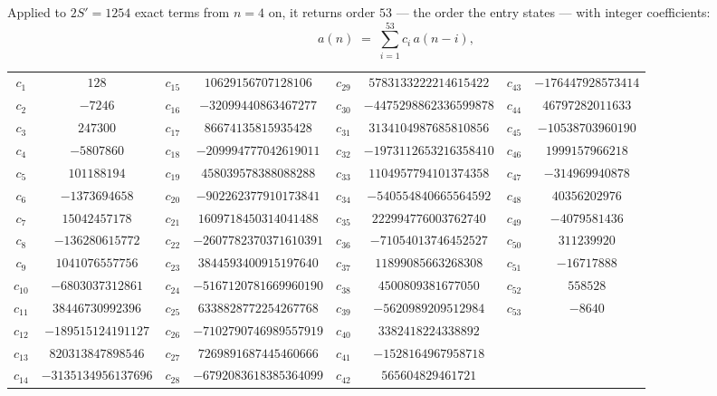 \documentclass[11pt,a4paper]{article}
\theoremstyle{plain}
\theoremstyle{definition}
\begin{document}
Applied to $2S'=1254$ exact terms from $n=4$ on, it returns order $53$ --- the
order the entry states --- with integer coefficients:
\[
a(n)\;=\;\sum_{i=1}^{53}c_i\,a(n-i),
\]
\begin{center}\small
\begin{tabular}{cccccccc}
$c_{1}$ & $128$ & $c_{15}$ & $10629156707128106$ & $c_{29}$ & $5783133222214615422$ & $c_{43}$ & $-176447928573414$ \\
$c_{2}$ & $-7246$ & $c_{16}$ & $-32099440863467277$ & $c_{30}$ & $-4475298862336599878$ & $c_{44}$ & $46797282011633$ \\
$c_{3}$ & $247300$ & $c_{17}$ & $86674135815935428$ & $c_{31}$ & $3134104987685810856$ & $c_{45}$ & $-10538703960190$ \\
$c_{4}$ & $-5807860$ & $c_{18}$ & $-209994777042619011$ & $c_{32}$ & $-1973112653216358410$ & $c_{46}$ & $1999157966218$ \\
$c_{5}$ & $101188194$ & $c_{19}$ & $458039578388088288$ & $c_{33}$ & $1104957794101374358$ & $c_{47}$ & $-314969940878$ \\
$c_{6}$ & $-1373694658$ & $c_{20}$ & $-902262377910173841$ & $c_{34}$ & $-540554840665564592$ & $c_{48}$ & $40356202976$ \\
$c_{7}$ & $15042457178$ & $c_{21}$ & $1609718450314041488$ & $c_{35}$ & $222994776003762740$ & $c_{49}$ & $-4079581436$ \\
$c_{8}$ & $-136280615772$ & $c_{22}$ & $-2607782370371610391$ & $c_{36}$ & $-71054013746452527$ & $c_{50}$ & $311239920$ \\
$c_{9}$ & $1041076557756$ & $c_{23}$ & $3844593400915197640$ & $c_{37}$ & $11899085663268308$ & $c_{51}$ & $-16717888$ \\
$c_{10}$ & $-6803037312861$ & $c_{24}$ & $-5167120781669960190$ & $c_{38}$ & $4500809381677050$ & $c_{52}$ & $558528$ \\
$c_{11}$ & $38446730992396$ & $c_{25}$ & $6338828772254267768$ & $c_{39}$ & $-5620989209512984$ & $c_{53}$ & $-8640$ \\
$c_{12}$ & $-189515124191127$ & $c_{26}$ & $-7102790746989557919$ & $c_{40}$ & $3382418224338892$ &  &  \\
$c_{13}$ & $820313847898546$ & $c_{27}$ & $7269891687445460666$ & $c_{41}$ & $-1528164967958718$ &  &  \\
$c_{14}$ & $-3135134956137696$ & $c_{28}$ & $-6792083618385364099$ & $c_{42}$ & $565604829461721$ &  &  \\
\end{tabular}
\end{center}
\end{document}
